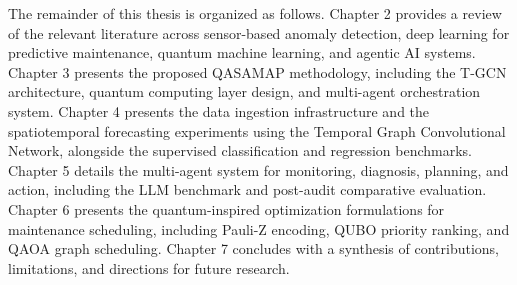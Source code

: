 The remainder of this thesis is organized as follows. Chapter 2 provides a review of the relevant literature across sensor-based anomaly detection, deep learning for predictive maintenance, quantum machine learning, and agentic AI systems. Chapter 3 presents the proposed QASAMAP methodology, including the T-GCN architecture, quantum computing layer design, and multi-agent orchestration system. Chapter 4 presents the data ingestion infrastructure and the spatiotemporal forecasting experiments using the Temporal Graph Convolutional Network, alongside the supervised classification and regression benchmarks. Chapter 5 details the multi-agent system for monitoring, diagnosis, planning, and action, including the LLM benchmark and post-audit comparative evaluation. Chapter 6 presents the quantum-inspired optimization formulations for maintenance scheduling, including Pauli-Z encoding, QUBO priority ranking, and QAOA graph scheduling. Chapter 7 concludes with a synthesis of contributions, limitations, and directions for future research.
